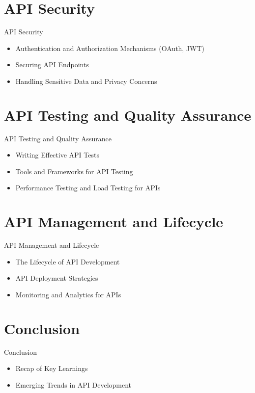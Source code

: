 \documentclass{beamer}
\begin{document}
\section{API Security}
\begin{frame}{API Security}
  \begin{itemize}
    \item Authentication and Authorization Mechanisms (OAuth, JWT)
    \item Securing API Endpoints
    \item Handling Sensitive Data and Privacy Concerns
  \end{itemize}
\end{frame}

\section{API Testing and Quality Assurance}
\begin{frame}{API Testing and Quality Assurance}
  \begin{itemize}
    \item Writing Effective API Tests
    \item Tools and Frameworks for API Testing
    \item Performance Testing and Load Testing for APIs
  \end{itemize}
\end{frame}


\section{API Management and Lifecycle}
\begin{frame}{API Management and Lifecycle}
  \begin{itemize}
    \item The Lifecycle of API Development
    \item API Deployment Strategies
    \item Monitoring and Analytics for APIs
  \end{itemize}
\end{frame}

\section{Conclusion}
\begin{frame}{Conclusion}
  \begin{itemize}
    \item Recap of Key Learnings
    \item Emerging Trends in API Development
  \end{itemize}
\end{frame}
\end{document}
